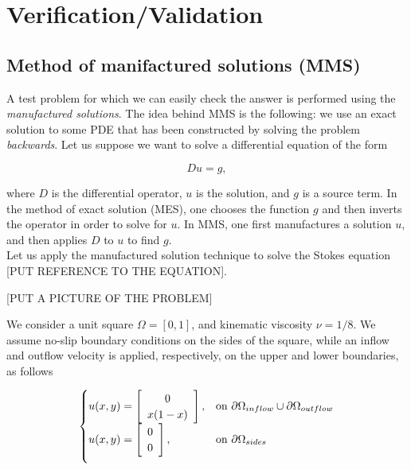 \documentclass[11pt,a4paper,titlepage]{report}
\begin{document}
\chapter{Verification/Validation}

\section{Method of manifactured solutions (MMS)}

A test problem for which we can easily check the answer is performed using the \textit{manufactured solutions}. The idea behind MMS is the following: we use an exact solution to some PDE that has been constructed by solving the problem \textit{backwards}. Let us suppose we want to solve a differential equation of the form 

\[
Du = g,
\]

where $D$ is the differential operator, $u$ is the solution, and $g$ is a source term. In the method of exact solution (MES), one chooses the function $g$ and then inverts the operator in order to solve for $u$. In MMS, one first manufactures a solution $u$, and then applies $D$ to $u$ to find $g$. \\

Let us apply the manufactured solution technique to solve the Stokes equation [PUT REFERENCE TO THE EQUATION]. 

[PUT A PICTURE OF THE PROBLEM]

We consider a unit square $\Omega = [0,1]$, and kinematic viscosity $\nu = 1/8$. We assume no-slip boundary conditions on the sides of the square, while an inflow and outflow velocity is applied, respectively, on the upper and lower boundaries, as follows

\[
\begin{cases}
u(x,y) = \left[ \begin{array}{c} 0 \\ x(1-x) \end{array} \right] , & \mbox{on } \partial \Omega_{inflow} \cup \partial \Omega_{outflow} \\

\vspace{.2cm}

u(x,y) = \left[ \begin{array}{c} 0 \\ 0 \end{array} \right], & \mbox{on } \partial \Omega_{sides}
\end{cases}
\]
\end{document}
